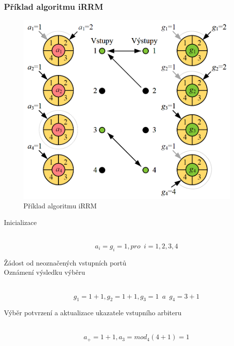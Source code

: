 \subsubsection{Příklad algoritmu iRRM}
\begin{figure}[ht]
\centering
  \begin{center}
    \includegraphics[scale=0.5]{BPC-HWS/images/iRRM_priklad.png}
  \end{center}
  \caption[Příklad algoritmu iRRM]{Příklad algoritmu iRRM}
\end{figure}
\begin{description}
  \item[Inicializace] \hfill \\
  \begin{equation}
      a_i = g_i = 1, pro \,\,\, i = 1, 2, 3, 4
  \end{equation}
  \item [Žádost od neoznačených vstupních portů] \hfill 
  \item [Oznámení výsledku výběru] \hfill \\
  \begin{equation}
      g_1 = 1 + 1, g_2 = 1 + 1, g_3 = 1\,\,\, a \,\,\, g_4 = 3 + 1
  \end{equation}
  \item [Výběr potvrzení a aktualizace ukazatele vstupního arbiteru] \hfill \\
\begin{equation}
    a_+ = 1 + 1, a_3 = mod_4{(4+1)} = 1
\end{equation}
\end{description}
